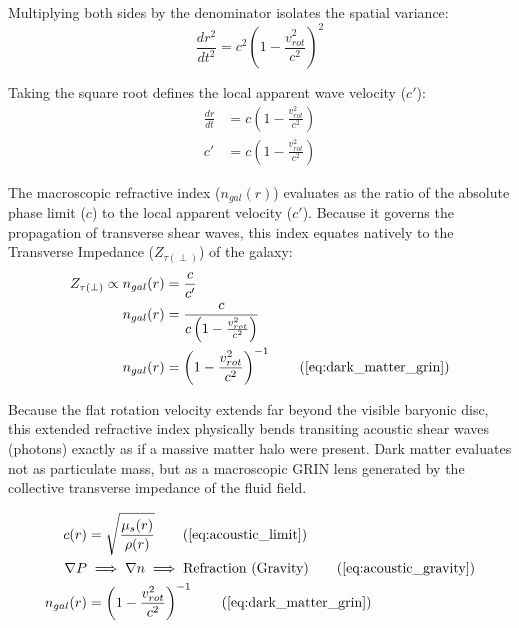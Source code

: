 \documentclass[11pt, a4paper]{article}
\begin{document}
Multiplying both sides by the denominator isolates the spatial variance:
\begin{equation}
    \frac{dr^2}{dt^2} = c^2 \left(1 - \frac{v_{rot}^2}{c^2}\right)^2 
\end{equation}

Taking the square root defines the local apparent wave velocity ($c'$):
\begin{align}
    \frac{dr}{dt} &= c \left(1 - \frac{v_{rot}^2}{c^2}\right)  \\
    c' &= c \left(1 - \frac{v_{rot}^2}{c^2}\right) 
\end{align}

The macroscopic refractive index ($n_{gal}(r)$) evaluates as the ratio of the absolute phase limit ($c$) to the local apparent velocity ($c'$). Because it   governs the propagation of transverse shear waves, this index equates natively to the Transverse Impedance ($Z_{\tau(\perp)}$) of the galaxy:
\begin{align}
    Z_{\tau(\perp)} \propto n_{gal}(r) &= \frac{c}{c'}  \\
    n_{gal}(r) &= \frac{c}{c \left( 1 - \frac{v_{rot}^2}{c^2} \right)}  \\
    n_{gal}(r) &= \left( 1 - \frac{v_{rot}^2}{c^2} \right)^{-1} \tag{\ref{eq:dark_matter_grin}}
\end{align}

Because the flat rotation velocity extends far beyond the visible baryonic disc, this extended refractive index physically bends transiting acoustic shear waves (photons) exactly as if a massive matter halo were present. Dark matter evaluates not as particulate mass, but as a macroscopic GRIN lens generated by the collective transverse impedance of the fluid field.

\begin{tcolorbox}[recallbox, title={\ref{box:macroscopic_grin}. Refractive Gravity \& Dark Matter}]
\begin{align}
    c(r) &= \sqrt{\frac{\mu_s(r)}{\rho(r)}} \tag{\ref{eq:acoustic_limit}} \\
    \nabla P &\implies \nabla n \implies \text{Refraction (Gravity)} \tag{\ref{eq:acoustic_gravity}} \\
    n_{gal}(r) &= \left( 1 - \frac{v_{rot}^2}{c^2} \right)^{-1} \tag{\ref{eq:dark_matter_grin}}
\end{align}
\end{tcolorbox}
\end{document}
